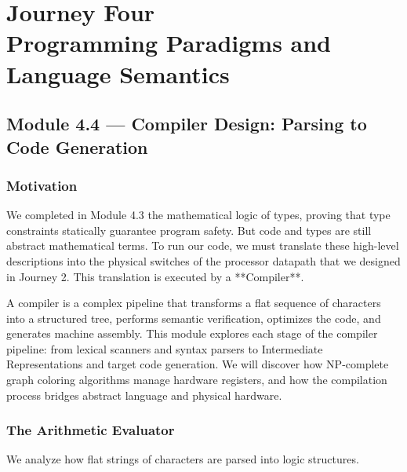\documentclass[12pt, a4paper]{book}
\begin{document}
\setcounter{chapter}{3}
\chapter[Journey 4 --- Programming Paradigms and Language Semantics]
        {Journey Four\\[8pt]
         \textcolor{ModuleColor}{\large Programming Paradigms and Language Semantics}}
\setcounter{section}{3}

\section{Module 4.4 --- Compiler Design: Parsing to Code Generation}
\label{sec:mod4.4}

\subsection*{Motivation}

We completed in Module 4.3 the mathematical logic of types, proving that type constraints statically guarantee program safety.
But code and types are still abstract mathematical terms.
To run our code, we must translate these high-level descriptions into the physical switches of the processor datapath that we designed in Journey 2.
This translation is executed by a **Compiler**.

A compiler is a complex pipeline that transforms a flat sequence of characters into a structured tree, performs semantic verification, optimizes the code, and generates machine assembly.
This module explores each stage of the compiler pipeline: from lexical scanners and syntax parsers to Intermediate Representations and target code generation.
We will discover how NP-complete graph coloring algorithms manage hardware registers, and how the compilation process bridges abstract language and physical hardware.

\subsection{The Arithmetic Evaluator}

We analyze how flat strings of characters are parsed into logic structures.
\end{document}
